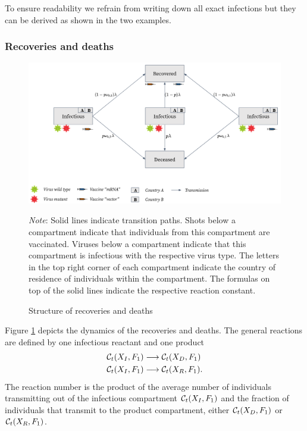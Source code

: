 To ensure readability we refrain from writing down all exact infections but they can be derived as shown in the two examples.

\subsubsection{Recoveries and deaths}
\begin{figure}[h!]
\centering
\includegraphics[scale=0.3]{images/overview_recovery.png}\\
\begin{flushleft}
\scriptsize{\textit{Note}: Solid lines indicate transition paths. Shots below a compartment indicate that individuals from this compartment are vaccinated. Viruses below a compartment indicate that this compartment is infectious with the respective virus type. The letters in the top right corner of each compartment indicate the country of residence of individuals within the compartment. The formulas on top of the solid lines indicate the respective reaction constant.}
\end{flushleft}
\caption{Structure of recoveries and deaths}
\label{fig:model_recoveries}
\end{figure}
Figure \ref{fig:model_recoveries} depicts the dynamics of the recoveries and deaths. The general reactions are defined by one infectious reactant and one product
\begin{align}
\label{eq:recovery}
    \mathcal{C}_t(X_I, F_1) & \longrightarrow  \mathcal{C}_t(X_D, F_1) \\
    \mathcal{C}_t(X_I, F_1) & \longrightarrow  \mathcal{C}_t(X_R, F_1). \notag
\end{align}
The reaction number is the product of the average number of individuals transmitting out of the infectious compartment $\mathcal{C}_t(X_I, F_1)$ and the fraction of individuals that transmit to the product compartment, either $\mathcal{C}_t(X_D, F_1)$ or $\mathcal{C}_t(X_R, F_1)$. \\

